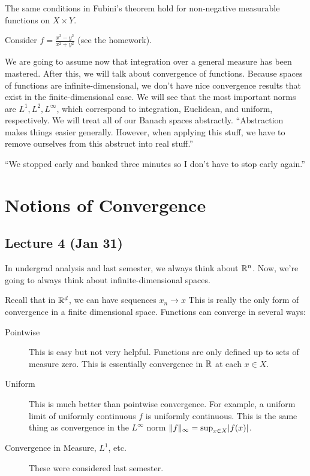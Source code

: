 \documentclass[10pt, twoside]{article}
\begin{document}
    \begin{thm}[Tonelli]
        The same conditions in Fubini's theorem hold for non-negative measurable functions on $X \times Y$.
    \end{thm}

    \begin{exm}
        Consider $f = \frac{x^2-y^2}{x^2+y^2}$ (see the homework).
    \end{exm}

    We are going to assume now that integration over a general measure has been mastered. After this, we will talk about convergence of functions. Because spaces of functions are infinite-dimensional, we don't have nice convergence results that exist in the finite-dimensional case. We will see that the most important norms are $L^1, L^2, L^{\infty}$, which correspond to integration, Euclidean, and uniform, respectively. We will treat all of our Banach spaces abstractly. ``Abstraction makes things easier generally. However, when applying this stuff, we have to remove ourselves from this abstruct into real stuff.''

    ``We stopped early and banked three minutes so I don't have to stop early again.''

    \section{Notions of Convergence}
    \subsection{Lecture 4 (Jan 31)}

    In undergrad analysis and last semester, we always think about $\mathbb{R}^n$. Now, we're going to always think about infinite-dimensional spaces.
    
    Recall that in $\mathbb{R}^d$, we can have sequences $x_n \rightarrow x$ This is really the only form of convergence in a finite dimensional space. Functions can converge in several ways:
    \begin{description}
        \item[Pointwise] This is easy but not very helpful. Functions are only defined up to sets of measure zero. This is essentially convergence in $\mathbb{R}$ at each $x \in X$.
        \item[Uniform] This is much better than pointwise convergence. For example, a uniform limit of uniformly continuous $f$ is uniformly continuous. This is the same thing as convergence in the $L^{\infty}$ norm $\lVert f\rVert_{\infty} = \sup_{x \in X} \lvert f(x)\rvert$. 
        \item[Convergence in Measure, $L^1$, etc.] These were considered last semester. 
    \end{description}
\end{document}

